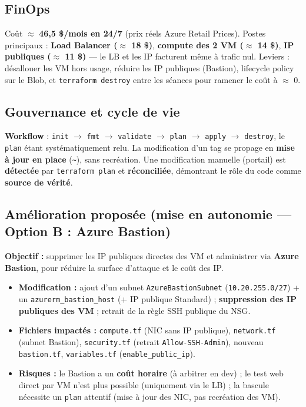 \documentclass[11pt,a4paper]{article}
\newcommand{\arr}{\ensuremath{\rightarrow}}
\newcommand{\code}[1]{\texttt{#1}}
\begin{document}
\subsection{FinOps}
Coût $\approx$ \textbf{46,5 \$/mois en 24/7} (prix réels Azure Retail Prices). Postes principaux : \textbf{Load
Balancer ($\approx$ 18 \$)}, \textbf{compute des 2 VM ($\approx$ 14 \$)}, \textbf{IP publiques ($\approx$
11 \$)} — le LB et les IP facturent même à trafic nul. Leviers : désallouer les VM hors usage, réduire les IP
publiques (Bastion), lifecycle policy sur le Blob, et \code{terraform destroy} entre les séances pour ramener
le coût à $\approx$ 0.

\subsection{Gouvernance et cycle de vie}
\textbf{Workflow} : \code{init} \arr{} \code{fmt} \arr{} \code{validate} \arr{} \code{plan} \arr{} \code{apply}
\arr{} \code{destroy}, le \code{plan} étant systématiquement relu. La modification d'un tag se propage en
\textbf{mise à jour en place} (\code{\textasciitilde}), sans recréation. Une modification manuelle (portail) est
\textbf{détectée} par \code{terraform plan} et \textbf{réconciliée}, démontrant le rôle du code comme
\textbf{source de vérité}.

\subsection{Amélioration proposée (mise en autonomie — Option B : Azure Bastion)}
\textbf{Objectif :} supprimer les IP publiques directes des VM et administrer via \textbf{Azure Bastion}, pour
réduire la surface d'attaque et le coût des IP.
\begin{itemize}
  \item \textbf{Modification :} ajout d'un subnet \code{AzureBastionSubnet} (\code{10.20.255.0/27}) + un \code{azurerm\_bastion\_host} (+ IP publique Standard) ; \textbf{suppression des IP publiques des VM} ; retrait de la règle SSH publique du NSG.
  \item \textbf{Fichiers impactés :} \code{compute.tf} (NIC sans IP publique), \code{network.tf} (subnet Bastion), \code{security.tf} (retrait \code{Allow-SSH-Admin}), nouveau \code{bastion.tf}, \code{variables.tf} (\code{enable\_public\_ip}).
  \item \textbf{Risques :} le Bastion a un \textbf{coût horaire} (à arbitrer en dev) ; le test web direct par VM n'est plus possible (uniquement via le LB) ; la bascule nécessite un \code{plan} attentif (mise à jour des NIC, pas recréation des VM).
\end{itemize}
\end{document}
